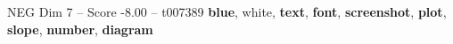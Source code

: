 \begin{textsample}{NEG Dim 7 – Score -8.00 – t007389}  \label{ex:f7_neg_003}
\textbf{blue}, white, \textbf{text}, \textbf{font}, \textbf{screenshot}, \textbf{plot}, \textbf{slope}, \textbf{number}, \textbf{diagram}

\end{textsample}
